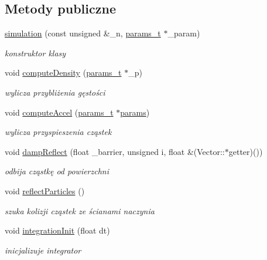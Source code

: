\subsection*{Metody publiczne}
\begin{DoxyCompactItemize}
\item 
\hyperlink{classsimulation_a30fdcc611ae9a656a3aebb8445e4607d}{simulation} (const unsigned \&\-\_\-n, \hyperlink{structparams__t}{params\-\_\-t} $\ast$\-\_\-param)
\begin{DoxyCompactList}\small\item\em konstruktor klasy \end{DoxyCompactList}\item 
void \hyperlink{classsimulation_a7679fcd9a25d6cb5597338d054a30684}{compute\-Density} (\hyperlink{structparams__t}{params\-\_\-t} $\ast$\-\_\-p)
\begin{DoxyCompactList}\small\item\em wylicza przybliżenia gęstości \end{DoxyCompactList}\item 
void \hyperlink{classsimulation_a16b945b81e27680a709fffd8663bf856}{compute\-Accel} (\hyperlink{structparams__t}{params\-\_\-t} $\ast$\hyperlink{classsimulation_a861b82cc3c0e7e58abfba464a133dae3}{params})
\begin{DoxyCompactList}\small\item\em wylicza przyspieszenia cząstek \end{DoxyCompactList}\item 
void \hyperlink{classsimulation_a353d4dd3a66197360e882bc29a6fef0b}{damp\-Reflect} (float \-\_\-barrier, unsigned i, float \&(Vector\-::$\ast$getter)())
\begin{DoxyCompactList}\small\item\em odbija cząstkę od powierzchni \end{DoxyCompactList}\item 
void \hyperlink{classsimulation_a9cb3fe3f985ceb039736a666923a20b5}{reflect\-Particles} ()
\begin{DoxyCompactList}\small\item\em szuka kolizji cząstek ze ścianami naczynia \end{DoxyCompactList}\item 
void \hyperlink{classsimulation_a300e67649652f2ae9337af3d5244e0f7}{integration\-Init} (float dt)
\begin{DoxyCompactList}\small\item\em inicjalizuje integrator \end{DoxyCompactList}\item 

\end{DoxyCompactItemize}
